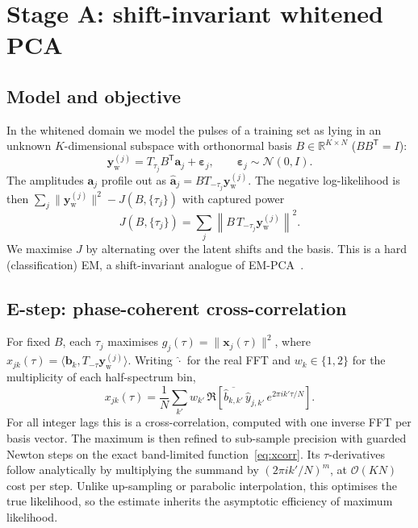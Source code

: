 \documentclass[aps,prapplied,reprint,superscriptaddress,longbibliography,nofootinbib]{revtex4-2}
\theoremstyle{remark}
\newcommand{\T}{\mathsf{T}}
\newcommand{\R}{\mathbb{R}}
\newcommand{\vect}[1]{\bm{#1}}
\newcommand{\Sh}[1]{T_{#1}}
\newcommand{\yw}{\vect{y}_{\mathrm w}}
\begin{document}
\section{Stage A: shift-invariant whitened PCA}
\label{sec:stageA}

\subsection{Model and objective}
In the whitened domain we model the pulses of a training set as lying in an unknown
$K$-dimensional subspace with orthonormal basis $B\in\R^{K\times N}$ ($BB^\T=I$):
\begin{equation}
\yw^{(j)} = \Sh{\tau_j} B^\T \vect a_j + \vect\varepsilon_j,
\qquad \vect\varepsilon_j\sim\mathcal N(0,I).
\end{equation}
The amplitudes $\vect a_j$ profile out as $\hat{\vect a}_j=B\Sh{-\tau_j}\yw^{(j)}$.
The negative log-likelihood is then $\sum_j\|\yw^{(j)}\|^2-J(B,\{\tau_j\})$ with
captured power
\begin{equation}
J(B,\{\tau_j\})=\sum_j \left\|B\,\Sh{-\tau_j}\yw^{(j)}\right\|^2 .
\label{eq:J}
\end{equation}
We maximise $J$ by alternating over the latent shifts and the basis. This is a hard
(classification) EM, a shift-invariant analogue of EM-PCA~\cite{Roweis1998,TippingBishop1999}.

\subsection{E-step: phase-coherent cross-correlation}
For fixed $B$, each $\tau_j$ maximises $g_j(\tau)=\|\vect x_j(\tau)\|^2$, where
$x_{jk}(\tau)=\langle\vect b_k,\Sh{-\tau}\yw^{(j)}\rangle$. Writing $\hat{\cdot}$
for the real FFT and $w_k\in\{1,2\}$ for the multiplicity of each half-spectrum
bin,
\begin{equation}
x_{jk}(\tau)=\frac1N\sum_{k'} w_{k'}\,\Re\!\left[\overline{\hat b_{k,k'}}\,
\hat y_{j,k'}\,e^{2\pi i k'\tau/N}\right].
\label{eq:xcorr}
\end{equation}
For all integer lags this is a cross-correlation, computed with one inverse FFT per
basis vector. The maximum is then refined to sub-sample precision with guarded
Newton steps on the exact band-limited function~\eqref{eq:xcorr}. Its
$\tau$-derivatives follow analytically by multiplying the summand by
$(2\pi i k'/N)^m$, at $\mathcal O(KN)$ cost per step. Unlike up-sampling or
parabolic interpolation, this optimises the true likelihood, so the estimate
inherits the asymptotic efficiency of maximum likelihood.
\end{document}
